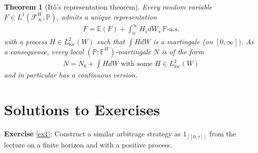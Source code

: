 \documentclass[12pt,a4paper, twoside]{article}
\newtheorem{thm}{Theorem}[section]
\theoremstyle{definition}
\newcommand{\EE}{\mathbb{E}} %
\newcommand{\PP}{\mathbb{P}} %
\begin{document}
\begin{thm}[Itô's representation theorem] Every random variable $F \in L^1( \mathcal{F}_\infty^W, \PP)$, admits a unique representation 
\begin{align*}
F= \EE(F) + \int_0^\infty H_s dW_s \ \PP\text{-a.s.}
\end{align*}
with a process $H \in L_\text{loc}^2(W)$ such that $ \int H dW$ is a martingale (on $[0,\infty])$. As a consequence, every local $( \PP; \mathbb{F}^W)$-martingale $N$ is of the form 
\begin{align*}
N = N_0 + \int H dW \text{ with some } H \in L_\text{loc}^2(W)
\end{align*}
and in particular has a continuous version.
\end{thm}
\newpage
\section{Solutions to Exercises}
\textbf{Exercise} \ref{ex1}: Construct a similar arbitrage strategy as $1_{[\![0, \tau]\!]}$ from the lecture on a finite horizon and with a positive process.
\end{document}
